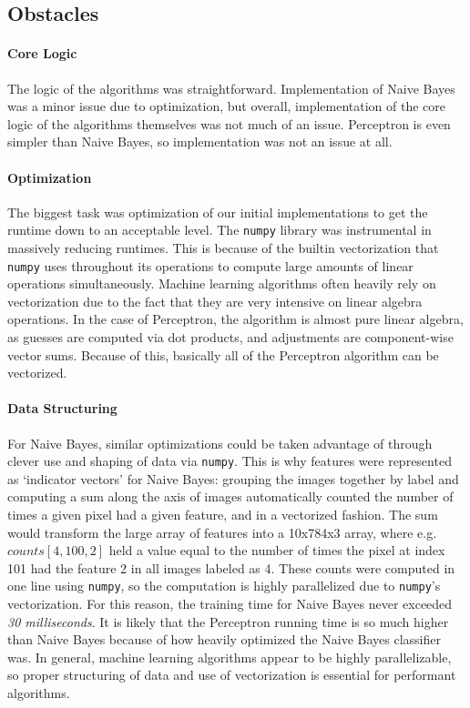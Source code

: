 \documentclass{article}
\begin{document}
  \subsection{Obstacles}
  \paragraph{Core Logic}
  The logic of the algorithms was straightforward.
  Implementation of Naive Bayes was a minor issue due to optimization, but overall, implementation of the core logic of the algorithms themselves was not much of an issue.
  Perceptron is even simpler than Naive Bayes, so implementation was not an issue at all.
  \paragraph{Optimization}
  The biggest task was optimization of our initial implementations to get the runtime down to an acceptable level.
  The \texttt{numpy} library was instrumental in massively reducing runtimes.
  This is because of the builtin vectorization that \texttt{numpy} uses throughout its operations to compute large amounts of linear operations simultaneously.
  Machine learning algorithms often heavily rely on vectorization due to the fact that they are very intensive on linear algebra operations.
  In the case of Perceptron, the algorithm is almost pure linear algebra, as guesses are computed via dot products, and adjustments are component-wise vector sums.
  Because of this, basically all of the Perceptron algorithm can be vectorized.
  \paragraph{Data Structuring}
  For Naive Bayes, similar optimizations could be taken advantage of through clever use and shaping of data via \texttt{numpy}.
  This is why features were represented as `indicator vectors' for Naive Bayes: grouping the images together by label and computing a sum along the axis of images automatically counted the number of times a given pixel had a given feature, and in a vectorized fashion.
  The sum would transform the large array of features into a 10x784x3 array, where e.g. $counts[4, 100, 2]$ held a value equal to the number of times the pixel at index 101 had the feature 2 in all images labeled as 4.
  These counts were computed in one line using \texttt{numpy}, so the computation is highly parallelized due to \texttt{numpy}'s vectorization.
  For this reason, the training time for Naive Bayes never exceeded {\em 30 milliseconds}.
  It is likely that the Perceptron running time is so much higher than Naive Bayes because of how heavily optimized the Naive Bayes classifier was.
  In general, machine learning algorithms appear to be highly parallelizable, so proper structuring of data and use of vectorization is essential for performant algorithms.
\end{document}
